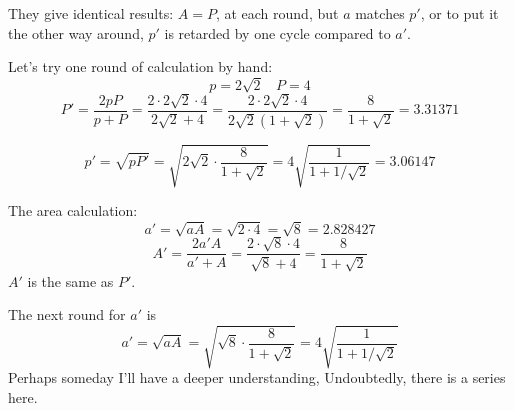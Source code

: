 \documentclass[11pt, oneside]{article}
\begin{document}
They give identical results:  $A = P$, at each round, but $a$ matches $p'$, or to put it the other way around, $p'$ is retarded by one cycle compared to $a'$.

Let's try one round of calculation by hand:
\[ p = 2 \sqrt{2} \ \ \ \ P = 4 \]
\[  P' = \frac{2pP}{p + P} = \frac{2 \cdot 2 \sqrt{2} \cdot 4}{ 2 \sqrt{2} + 4} = \frac{2 \cdot 2 \sqrt{2} \cdot 4}{ 2 \sqrt{2}(1 + \sqrt{2})} = \frac{8}{1 + \sqrt{2}} = 3.31371  \]

\[ p' = \sqrt{pP'} = \sqrt{2 \sqrt{2} \cdot \frac{8}{1 + \sqrt{2}}} = 4 \sqrt{\frac{1}{1 +1/ \sqrt{2}} } = 3.06147 \]

The area calculation:
\[ a' =  \sqrt{aA} = \sqrt{2 \cdot 4} = \sqrt{8} = 2.828427 \]
\[ A' = \frac{2a'A}{a' + A} =  \frac{2 \cdot \sqrt{8}\cdot 4}{\sqrt{8} + 4} =  \frac{8}{1 + \sqrt{2}} \]
$A'$ is the same as $P'$.

The next round for $a'$ is
\[ a' =  \sqrt{aA} = \sqrt{ \sqrt{8} \cdot  \frac{8}{1 + \sqrt{2}}} = 4 \sqrt{ \frac{1}{1 + 1/ \sqrt{2}}} \]
Perhaps someday I'll have a deeper understanding, Undoubtedly, there is a series here.
\end{document}
